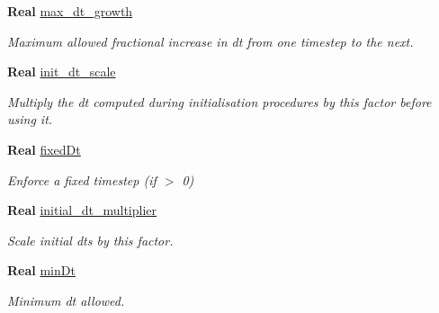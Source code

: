 \begin{DoxyCompactItemize}
\mbox{\label{struct_mushy_layer_options_a2b2b434f8c842db679314d1226d83930}} 
\textbf{ Real} \hyperlink{struct_mushy_layer_options_a2b2b434f8c842db679314d1226d83930}{max\+\_\+dt\+\_\+growth}
\begin{DoxyCompactList}\small\item\em Maximum allowed fractional increase in dt from one timestep to the next. \end{DoxyCompactList}\item 
\textbf{ Real} \hyperlink{struct_mushy_layer_options_a4aaa6aa92a57d3df414d311ded23b0a6}{init\+\_\+dt\+\_\+scale}
\begin{DoxyCompactList}\small\item\em Multiply the dt computed during initialisation procedures by this factor before using it. \end{DoxyCompactList}\item 
\mbox{\label{struct_mushy_layer_options_ae7c7b327c2036f515ad784e1deaedf1d}} 
\textbf{ Real} \hyperlink{struct_mushy_layer_options_ae7c7b327c2036f515ad784e1deaedf1d}{fixed\+Dt}
\begin{DoxyCompactList}\small\item\em Enforce a fixed timestep (if $>$ 0) \end{DoxyCompactList}\item 
\mbox{\label{struct_mushy_layer_options_af369a77065b02e1b2b5eb9089dc1264d}} 
\textbf{ Real} \hyperlink{struct_mushy_layer_options_af369a77065b02e1b2b5eb9089dc1264d}{initial\+\_\+dt\+\_\+multiplier}
\begin{DoxyCompactList}\small\item\em Scale initial dt\textquotesingle{}s by this factor. \end{DoxyCompactList}\item 
\mbox{\label{struct_mushy_layer_options_a5e1892ed6c932ef8f24cf957e8d998df}} 
\textbf{ Real} \hyperlink{struct_mushy_layer_options_a5e1892ed6c932ef8f24cf957e8d998df}{min\+Dt}
\begin{DoxyCompactList}\small\item\em Minimum dt allowed. \end{DoxyCompactList}\item 
\mbox{\label{struct_mushy_layer_options_aa10931f3d610f30a954fd28f3dc74df8}} 

\end{DoxyCompactItemize}
